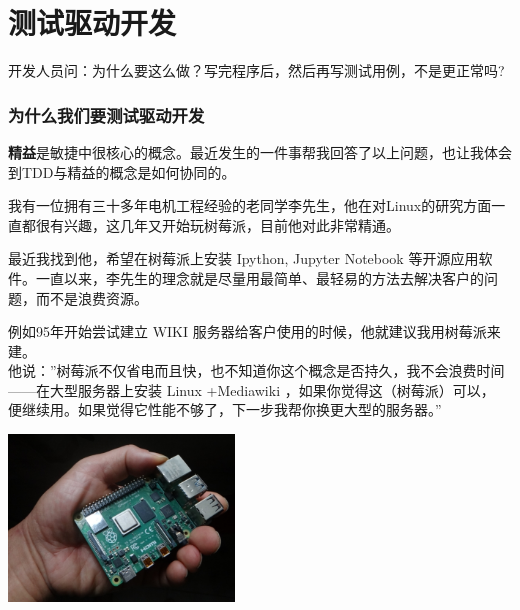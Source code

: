 \chapter{测试驱动开发} %


开发人员问：为什么要这么做？写完程序后，然后再写测试用例，不是更正常吗?

\hypertarget{ux4e3aux4ec0ux4e48ux6211ux4eecux8981ux6d4bux8bd5ux9a71ux52a8ux5f00ux53d1}{%
\subsection{为什么我们要测试驱动开发}\label{ux4e3aux4ec0ux4e48ux6211ux4eecux8981ux6d4bux8bd5ux9a71ux52a8ux5f00ux53d1}}

\textbf{精益}是敏捷中很核心的概念。最近发生的一件事帮我回答了以上问题，也让我体会到TDD与精益的概念是如何协同的。

我有一位拥有三十多年电机工程经验的老同学李先生，他在对Linux的研究方面一直都很有兴趣，这几年又开始玩树莓派，目前他对此非常精通。

最近我找到他，希望在树莓派上安装 Ipython, Jupyter Notebook
等开源应用软件。一直以来，李先生的理念就是尽量用最简单、最轻易的方法去解决客户的问题，而不是浪费资源。

例如95年开始尝试建立 WIKI
服务器给客户使用的时候，他就建议我用树莓派来建。\\
他说：''树莓派不仅省电而且快，也不知道你这个概念是否持久，我不会浪费时间------在大型服务器上安装
Linux +Mediawiki ，如果你觉得这（树莓派）可以，
便继续用。如果觉得它性能不够了，下一步我帮你换更大型的服务器。''


\includegraphics[width=6cm]{树莓派.jpg}

